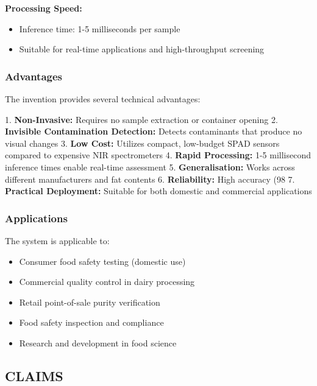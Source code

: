 \documentclass[11pt,a4paper]{article}
\begin{document}
\begin{enumerate}[leftmargin=*,label=\alph*)]
\textbf{Processing Speed:}
\begin{itemize}[leftmargin=*]
\item Inference time: 1-5 milliseconds per sample
\item Suitable for real-time applications and high-throughput screening
\end{itemize}

\subsubsection{Advantages}

The invention provides several technical advantages:

1. \textbf{Non-Invasive:} Requires no sample extraction or container opening
2. \textbf{Invisible Contamination Detection:} Detects contaminants that produce no visual changes
3. \textbf{Low Cost:} Utilizes compact, low-budget SPAD sensors compared to expensive NIR spectrometers
4. \textbf{Rapid Processing:} 1-5 millisecond inference times enable real-time assessment
5. \textbf{Generalisation:} Works across different manufacturers and fat contents
6. \textbf{Reliability:} High accuracy (98%
7. \textbf{Practical Deployment:} Suitable for both domestic and commercial applications

\subsubsection{Applications}

The system is applicable to:
\begin{itemize}[leftmargin=*]
\item Consumer food safety testing (domestic use)
\item Commercial quality control in dairy processing
\item Retail point-of-sale purity verification
\item Food safety inspection and compliance
\item Research and development in food science
\end{itemize}

\vspace{0.5em}
\subsection{CLAIMS}


\end{enumerate}
\end{document}
